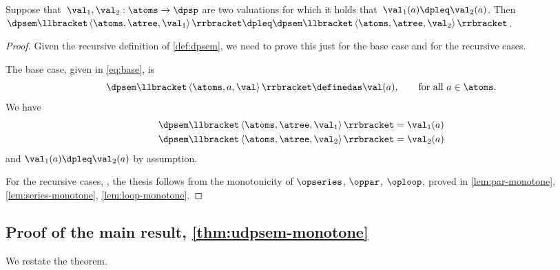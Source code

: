 \begin{lemma}
    \label{lem:dpsem-monotone}Suppose that~$\val_{1},\val_{2}:\atoms\rightarrow\dpsp$
    are two valuations for which it holds that~$\val_{1}(a)\dpleq\val_{2}(a)$.
    Then~$\dpsem\llbracket\left\langle \atoms,\atree,\val_{1}\right\rangle \rrbracket\dpleq\dpsem\llbracket\left\langle \atoms,\atree,\val_{2}\right\rangle \rrbracket$.
\end{lemma}
\begin{proof}
    Given the recursive definition of \cref{def:dpsem}, we need
    to prove this just for the base case and for the recursive cases.

    The base case, given in \cref{eq:base}, is
    \[
        \dpsem\llbracket\left\langle \atoms,a,\val\right\rangle \rrbracket\definedas\val(a),\qquad\text{for all}\ a\in\atoms.
    \]
    We have
    \begin{align*}
        \dpsem\llbracket\left\langle \atoms,\atree,\val_{1}\right\rangle \rrbracket & =\val_{1}(a)\\
        \dpsem\llbracket\left\langle \atoms,\atree,\val_{2}\right\rangle \rrbracket & =\val_{2}(a)
    \end{align*}
    and $\val_{1}(a)\dpleq\val_{2}(a)$ by assumption.

    For the recursive cases, ,
    the thesis follows from the monotonicity of $\opseries$, $\oppar$,
    $\oploop$, proved in \cref{lem:par-monotone}, \cref{lem:series-monotone},
    \cref{lem:loop-monotone}.
\end{proof}

\subsection{Proof of the main result, \cref{thm:udpsem-monotone}}

\label{subsec:proof-main-result}

We restate the theorem.

